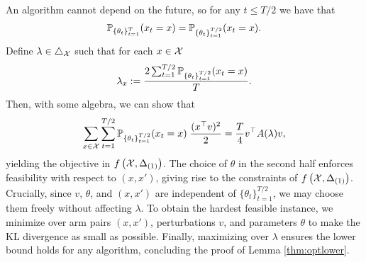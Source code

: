  An algorithm cannot depend on the future, so for any $t \leq T/2$ we have that \begin{equation}
     \P_{\{\theta_t\}_{t=1}^{T}}(x_t=x) =\P_{\{\theta_t\}_{t=1}^{T/2}}(x_t=x).
 \end{equation}Define $\lambda \in \triangle_{\X}$ such that for each $x \in \X$
 \begin{equation}
     \lambda_x := \frac{2\sum_{t=1}^{T/2}\P_{\{\theta_t\}_{t=1}^{T/2}}(x_t = x)}{T}.
 \end{equation} Then, with some algebra, we can show that \begin{equation}
     \sum_{x \in \X}\sum_{t=1}^{T/2}\P_{\{\theta_t\}_{t=1}^{T/2}}(x_t = x) \; \frac{(x^\top v)^2}{2} =\frac{T}{4} v^\top A(\lambda)v,
 \end{equation}yielding the objective in $f\left(\X, \Delta_{(1)}\right)$. The choice of $\theta$ in the second half enforces feasibility with respect to $(x,x')$, giving rise to the constraints of $f\left(\X, \Delta_{(1)}\right)$. Crucially, since $v$, $\theta$, and $(x, x')$ are independent of $\{\theta_t\}_{t=1}^{T/2}$, we may choose them freely without affecting $\lambda$. To obtain the hardest feasible instance, we minimize over arm pairs $(x, x')$, perturbations $v$, and parameters $\theta$ to make the KL divergence as small as possible. Finally, maximizing over $\lambda$ ensures the lower bound holds for any algorithm, concluding the proof of Lemma \ref{thm:optlower}.
